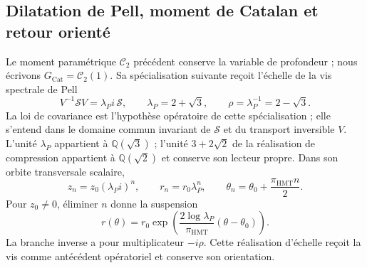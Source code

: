\subsection{Dilatation de Pell, moment de Catalan et retour orienté}
\label{corpus9:iv:pell}

Le moment paramétrique \(\mathcal C_2\) précédent conserve la
variable de profondeur ; nous écrivons
\(G_{\mathrm{Cat}}=\mathcal C_2(1)\).
Sa spécialisation suivante reçoit
l’échelle de la vis spectrale de Pell
\[
 V^{-1}\mathscr S V=\lambda_P i\,\mathscr S,\qquad
 \lambda_P=2+\sqrt3,\qquad \rho=\lambda_P^{-1}=2-\sqrt3.
\]
La loi de covariance est l’hypothèse opératoire de cette
spécialisation ; elle s’entend dans le domaine commun invariant
de \(\mathscr S\) et du transport inversible \(V\).
L’unité \(\lambda_P\) appartient à \(\mathbb Q(\sqrt3)\) ;
l’unité \(3+2\sqrt2\) de la réalisation de compression
appartient à \(\mathbb Q(\sqrt2)\) et conserve son lecteur propre.
Dans son orbite transversale scalaire,
\[
 z_n=z_0(\lambda_P i)^n,\qquad
 r_n=r_0\lambda_P^n,\qquad
 \theta_n=\theta_0+\frac{\pi_{\mathrm{HMT}}n}{2}.
\]
Pour \(z_0\ne0\), éliminer \(n\) donne la suspension
\[
 r(\theta)=r_0\exp\!\left(
   \frac{2\log\lambda_P}{\pi_{\mathrm{HMT}}}
   (\theta-\theta_0)\right).
\]
La branche inverse a pour multiplicateur \(-i\rho\). Cette
réalisation d’échelle reçoit la vis comme antécédent
opératoriel et conserve son orientation.

